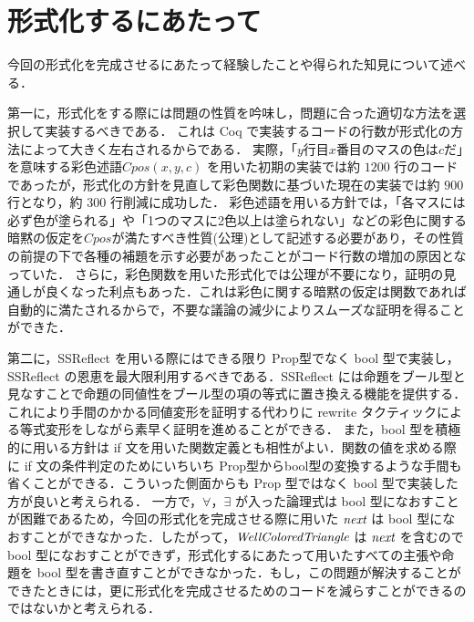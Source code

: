 \section{形式化するにあたって}

今回の形式化を完成させるにあたって経験したことや得られた知見について述べる．

第一に，形式化をする際には問題の性質を吟味し，問題に合った適切な方法を選択して実装するべきである．
これは Coq で実装するコードの行数が形式化の方法によって大きく左右されるからである．
実際，「$y$行目$x$番目のマスの色は$c$だ」を意味する彩色述語$Cpos(x,y,c)$ を用いた初期の実装では約 $1200$ 行のコードであったが，形式化の方針を見直して彩色関数に基づいた現在の実装では約 $900$ 行となり，約 $300$ 行削減に成功した．
彩色述語を用いる方針では，「各マスには必ず色が塗られる」や「1つのマスに2色以上は塗られない」などの彩色に関する暗黙の仮定を$Cpos$が満たすべき性質(公理)として記述する必要があり，その性質の前提の下で各種の補題を示す必要があったことがコード行数の増加の原因となっていた．
さらに，彩色関数を用いた形式化では公理が不要になり，証明の見通しが良くなった利点もあった．これは彩色に関する暗黙の仮定は関数であれば自動的に満たされるからで，不要な議論の減少によりスムーズな証明を得ることができた．

第二に，SSReflect を用いる際にはできる限り Prop型でなく bool 型で実装し，SSReflect の恩恵を最大限利用するべきである．SSReflect には命題をブール型と見なすことで命題の同値性をブール型の項の等式に置き換える機能を提供する．これにより手間のかかる同値変形を証明する代わりに rewrite タクティックによる等式変形をしながら素早く証明を進めることができる．
また，bool 型を積極的に用いる方針は if 文を用いた関数定義とも相性がよい．関数の値を求める際に if 文の条件判定のためにいちいち Prop型からbool型の変換するような手間も省くことができる．こういった側面からも Prop 型ではなく bool 型で実装した方が良いと考えられる．
一方で，$\forall$，$\exists$ が入った論理式は bool 型になおすことが困難であるため，今回の形式化を完成させる際に用いた $\textit{next}$ は bool 型になおすことができなかった．したがって，$\textit{WellColoredTriangle}$ は $\textit{next}$ を含むので bool 型になおすことができず，形式化するにあたって用いたすべての主張や命題を bool 型を書き直すことができなかった．もし，この問題が解決することができたときには，更に形式化を完成させるためのコードを減らすことができるのではないかと考えられる．


